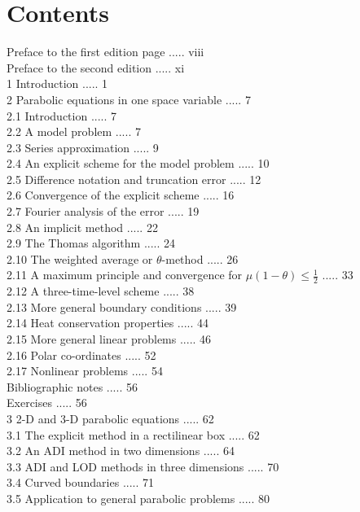 \documentclass[10pt]{article}
\begin{document}
\section*{Contents}
Preface to the first edition page ..... viii\\
Preface to the second edition ..... xi\\
1 Introduction ..... 1\\
2 Parabolic equations in one space variable ..... 7\\
2.1 Introduction ..... 7\\
2.2 A model problem ..... 7\\
2.3 Series approximation ..... 9\\
2.4 An explicit scheme for the model problem ..... 10\\
2.5 Difference notation and truncation error ..... 12\\
2.6 Convergence of the explicit scheme ..... 16\\
2.7 Fourier analysis of the error ..... 19\\
2.8 An implicit method ..... 22\\
2.9 The Thomas algorithm ..... 24\\
2.10 The weighted average or \(\theta\)-method ..... 26\\
2.11 A maximum principle and convergence for \(\mu(1-\theta) \leq \frac{1}{2}\) ..... 33\\
2.12 A three-time-level scheme ..... 38\\
2.13 More general boundary conditions ..... 39\\
2.14 Heat conservation properties ..... 44\\
2.15 More general linear problems ..... 46\\
2.16 Polar co-ordinates ..... 52\\
2.17 Nonlinear problems ..... 54\\
Bibliographic notes ..... 56\\
Exercises ..... 56\\
3 2-D and 3-D parabolic equations ..... 62\\
3.1 The explicit method in a rectilinear box ..... 62\\
3.2 An ADI method in two dimensions ..... 64\\
3.3 ADI and LOD methods in three dimensions ..... 70\\
3.4 Curved boundaries ..... 71\\
3.5 Application to general parabolic problems ..... 80\\
\end{document}
